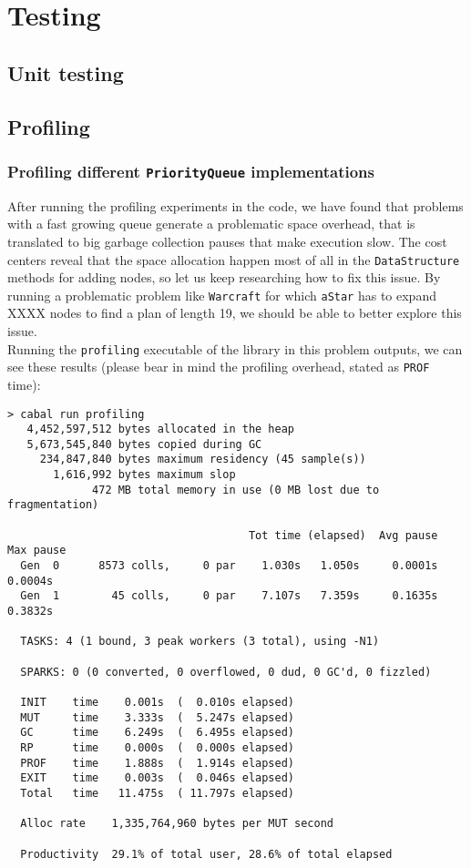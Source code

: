 \section{Testing}

\subsection{Unit testing}
\subsection{Profiling}

\subsubsection{Profiling different \texttt{PriorityQueue} implementations}


After running the profiling experiments in the code, we have found that
problems with a fast growing queue generate a problematic space overhead, that
is translated to big garbage collection pauses that make execution slow. The
cost centers reveal that the space allocation happen most of all in the
\texttt{DataStructure} methods for adding nodes, so let us keep researching how
to fix this issue. By running a problematic problem like \texttt{Warcraft} for
which \texttt{aStar} has to expand XXXX nodes to find a plan of length 19, we
should be able to better explore this issue.\\

Running the \texttt{profiling} executable of the library in this problem
outputs, we can see these results (please bear in mind the profiling overhead,
stated as \texttt{PROF} time):

\begin{lstlisting}
> cabal run profiling
   4,452,597,512 bytes allocated in the heap
   5,673,545,840 bytes copied during GC
     234,847,840 bytes maximum residency (45 sample(s))
       1,616,992 bytes maximum slop
             472 MB total memory in use (0 MB lost due to fragmentation)

                                     Tot time (elapsed)  Avg pause  Max pause
  Gen  0      8573 colls,     0 par    1.030s   1.050s     0.0001s    0.0004s
  Gen  1        45 colls,     0 par    7.107s   7.359s     0.1635s    0.3832s

  TASKS: 4 (1 bound, 3 peak workers (3 total), using -N1)

  SPARKS: 0 (0 converted, 0 overflowed, 0 dud, 0 GC'd, 0 fizzled)

  INIT    time    0.001s  (  0.010s elapsed)
  MUT     time    3.333s  (  5.247s elapsed)
  GC      time    6.249s  (  6.495s elapsed)
  RP      time    0.000s  (  0.000s elapsed)
  PROF    time    1.888s  (  1.914s elapsed)
  EXIT    time    0.003s  (  0.046s elapsed)
  Total   time   11.475s  ( 11.797s elapsed)

  Alloc rate    1,335,764,960 bytes per MUT second

  Productivity  29.1% of total user, 28.6% of total elapsed
\end{lstlisting}


